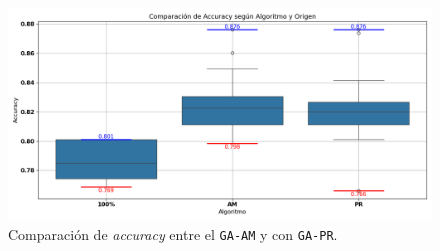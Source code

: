 \begin{figure}[htp]
    \centering
    \includegraphics[width=1\textwidth]{imagenes/evaluaciones/reinicio-poblacional.png}
    \caption{Comparación de \textit{accuracy} entre el \texttt{GA-AM} y con \texttt{GA-PR}.}
    \label{fig:reinicio_poblacional}
\end{figure}
